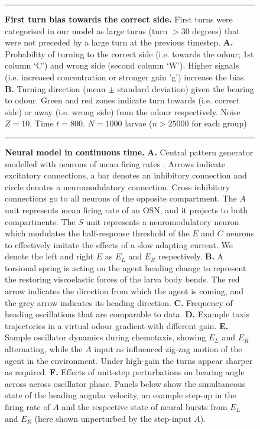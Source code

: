\documentclass[11pt,a4paper]{article}
\newcommand{\todoBW}[1]{\todo[author=BW,color=orange, size=\tiny,inline]{#1}}
\begin{document}
\begin{figure}
\begin{center}
\caption{{\bf First turn bias towards the correct side.} First turns were categorised in our model as large turns (turn $>30$ degrees) that were not preceded by a large turn at the previous timestep.
{\bf A.} Probability of turning to the correct side (i.e. towards the odour; 1st column ‘C’) and wrong side (second column ‘W’). Higher signals (i.e. increased concentration or stronger gain 'g') increase the bias.
{\bf B.} Turning direction (mean $\pm$ standard deviation) given the bearing to odour. Green and red zones indicate turn towards (i.e. correct side) or away (i.e. wrong side) from the odour respectively. Noise $Z = 10$. Time $t=800$. $N=1000$ larvae ($n > 25000$ for each group)
\label{fig:FirstTurn}}
\end{center}
\hrule
\end{figure}


\begin{figure}
\begin{center}
\caption{{\bf Neural model in continuous time.} {\bf A.} Central pattern generator modelled with neurons of mean firing rates  \citep[adapted from ][]{wilson1999spikes}.
  Arrows indicate excitatory connections, a bar denotes an inhibitory connection and circle denotes a neuromodulatory connection. Cross inhibitory connections go to all neurons of the opposite compartment.
   The $A$ unit represents mean firing rate of an OSN, and it projects to both compartments.
   The $S$ unit represents a neuromodulatory neuron which  modulates the half-response threshold of the $E$ and $C$ neurons  to effectively imitate the effects of a slow adapting current. We denote the left and right $E$ as $E_L$ and $E_R$ respectively.
{\bf B.} A torsional spring is acting on the agent heading change to represent the restoring viscoelastic forces of the larva body bends. The red arrow indicates the direction from which the agent is coming, and the grey arrow indicates its heading direction.
{\bf C.} Frequency of heading oscillations that are comparable to data.
{\bf D.} Example taxis trajectories in a virtual odour gradient with different gain.
{\bf E.} Sample oscillator dynamics during chemotaxis, showing $E_L$ and $E_R$ alternating, while the $A$ input as influenced zig-zag motion of the agent in the environment. Under high-gain the turns appear sharper as required.
{\bf F.} Effects of unit-step perturbations on bearing angle across across oscillator phase.
 Panels below show the simultaneous state of the heading angular velocity, an example step-up in the firing rate of $A$ and the respective state of neural bursts from $E_L$ and $E_R$ (here shown unperturbed by the step-input $A$).
\label{fig:LampreyModel}}
\end{center}
\hrule
\end{figure}
\end{document}
